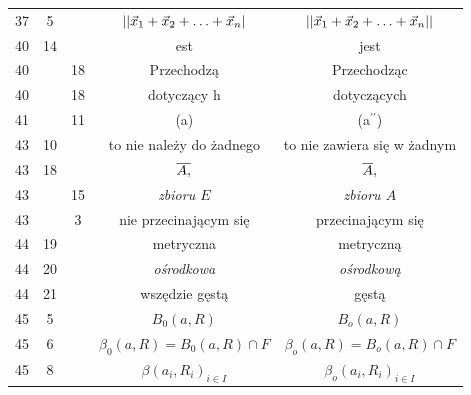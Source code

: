 \documentclass[a4paper,11pt]{article}
\begin{document}
\begin{center}
\begin{tabular}{|c|c|c|c|c|}
    37  &  5 & & $|| \vec{ x }_{ 1 } + \vec{ x }_{ 2 } + \ldots + \vec{ x }_{ n } |$
           & $|| \vec{ x }_{ 1 } + \vec{ x }_{ 2 } + \ldots + \vec{ x }_{ n } ||$
    \\
    40  & 14 & & est & jest \\
    40  & & 18 & Przechodzą & Przechodząc \\
    40  & & 18 & dotyczący h & dotyczących \\
    41  & & 11 & (a) & (a$^{ \prime \prime }$) \\
    43  & 10 & & to nie należy do żadnego & to nie zawiera się w żadnym \\
    43  & 18 & & $\overline{A,}$ & $\overline{A},$ \\
    43  & & 15 & \emph{zbioru $E$} & \emph{zbioru $A$} \\
    43  & &  3 & nie przecinającym się & przecinającym się \\
    44  & 19 & & metryczna & metryczną \\
    44  & 20 & & \emph{ośrodkowa} & \emph{ośrodkową} \\
    44  & 21 & & wszędzie gęstą & gęstą \\
    45  &  5 & & $B_{ 0 }( a, R )$ & $B_{ o }( a, R )$ \\
    45  &  6 & & $\beta_{ 0 }( a, R ) = B_{ 0 }( a, R ) \cap F$
           & $\beta_{ o }( a, R ) = B_{ o }( a, R ) \cap F$ \\
    45  &  8 & & $\beta( a_{ i }, R_{ i } )_{ i \in I }$
           & $\beta_{ o }( a_{ i }, R_{ i } )_{ i \in I }$ \\
    \hline
  \end{tabular}


\end{center}
\end{document}
